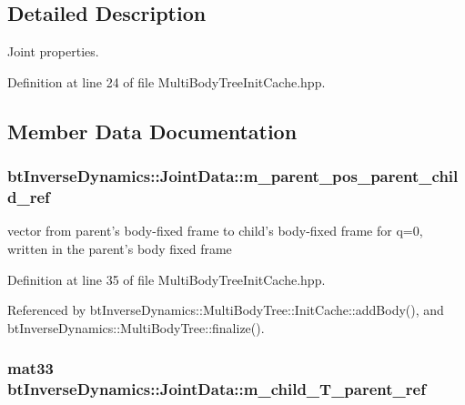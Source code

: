 \subsection{Detailed Description}
Joint properties. 

Definition at line 24 of file MultiBodyTreeInitCache.hpp.

\subsection{Member Data Documentation}
\hypertarget{structbt_inverse_dynamics_1_1_joint_data_56c1cd9b4021ca0c202cd059e0759993}{
\subsubsection[m\_\-parent\_\-pos\_\-parent\_\-child\_\-ref]{ {\bf btInverseDynamics::JointData::m\_\-parent\_\-pos\_\-parent\_\-child\_\-ref}}}
\label{structbt_inverse_dynamics_1_1_joint_data_56c1cd9b4021ca0c202cd059e0759993}


vector from parent's body-fixed frame to child's body-fixed frame for q=0, written in the parent's body fixed frame 

Definition at line 35 of file MultiBodyTreeInitCache.hpp.

Referenced by btInverseDynamics::MultiBodyTree::InitCache::addBody(), and btInverseDynamics::MultiBodyTree::finalize().\hypertarget{structbt_inverse_dynamics_1_1_joint_data_6725b907ac280e9fd3d1fa8f0032fda4}{
\subsubsection[m\_\-child\_\-T\_\-parent\_\-ref]{\setlength{\rightskip}{0pt plus 5cm}mat33 {\bf btInverseDynamics::JointData::m\_\-child\_\-T\_\-parent\_\-ref}}}
\label{structbt_inverse_dynamics_1_1_joint_data_6725b907ac280e9fd3d1fa8f0032fda4}


